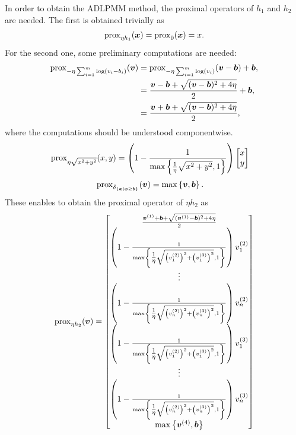 In order to obtain the ADLPMM method, the proximal operators of $h_1$ and $h_2$ are needed. The first is obtained trivially as 
\begin{align*}
	\operatorname{prox}_{\eta h_1}(\boldsymbol x) = \operatorname{prox}_{0}(\boldsymbol x) = x. 
\end{align*}
For the second one, some preliminary computations are needed:
\begin{align*}
	\operatorname{prox}_{- \eta \sum_{i=1}^m\log\left( v_i - b_i\right)}(\boldsymbol v) &= \operatorname{prox}_{- \eta \sum_{i=1}^m\log\left( v_i \right)}(\boldsymbol v - \boldsymbol b) + \boldsymbol b,\\
	&= \frac{\boldsymbol v - \boldsymbol b+\sqrt{(\boldsymbol v - \boldsymbol b)^2+4\eta}}{2} + \boldsymbol b,\\
		&= \frac{\boldsymbol v + \boldsymbol b+\sqrt{(\boldsymbol v - \boldsymbol b)^2+4\eta}}{2},
\end{align*}
where the computations should be understood componentwise. 
\begin{align*}
	\operatorname{prox}_{\eta \sqrt{x^2+y^2}}(x,y) &= \left(1-\frac{1}{\max\left\{{\textstyle\frac{1}{\eta}} \sqrt{x^2+y^2},1 \right\}}\right) \begin{bmatrix}
		x\\y
	\end{bmatrix}
\end{align*}
\begin{align*}
	\operatorname{prox}_{\delta_{\left\{\boldsymbol x|\boldsymbol x \geq \boldsymbol b\right\}}}(\boldsymbol v) &=\max\left\{\boldsymbol v,\boldsymbol b\right\}. 
\end{align*}
These enables to obtain the proximal operator of $\eta h_2$ as 
\begin{align*}
	\operatorname{prox}_{\eta h_2}(\boldsymbol v) = \begin{bmatrix}
		 \frac{\boldsymbol v^{(1)} + \boldsymbol b+\sqrt{(\boldsymbol v^{(1)} - \boldsymbol b)^2+4\eta}}{2}\\
		  \left(1-\frac{1}{\max\left\{{\textstyle\frac{1}{\eta}} \sqrt{\left(v^{(2)}_1\right)^2+\left(v^{(3)}_1\right)^2},1 \right\}}\right)v^{(2)}_1\\
		 \vdots\\
		 \left(1-\frac{1}{\max\left\{{\textstyle\frac{1}{\eta}} \sqrt{\left(v^{(2)}_n\right)^2+\left(v^{(3)}_n\right)^2},1 \right\}}\right)v^{(2)}_n\\
		 		  \left(1-\frac{1}{\max\left\{{\textstyle\frac{1}{\eta}} \sqrt{\left(v^{(2)}_1\right)^2+\left(v^{(3)}_1\right)^2},1 \right\}}\right)v^{(3)}_1\\
		 \vdots\\
		 \left(1-\frac{1}{\max\left\{{\textstyle\frac{1}{\eta}} \sqrt{\left(v^{(2)}_n\right)^2+\left(v^{(3)}_n\right)^2},1 \right\}}\right)v^{(3)}_n\\
		 \max\left\{\boldsymbol v^{(4)},\boldsymbol b\right\}
	\end{bmatrix}
\end{align*}
